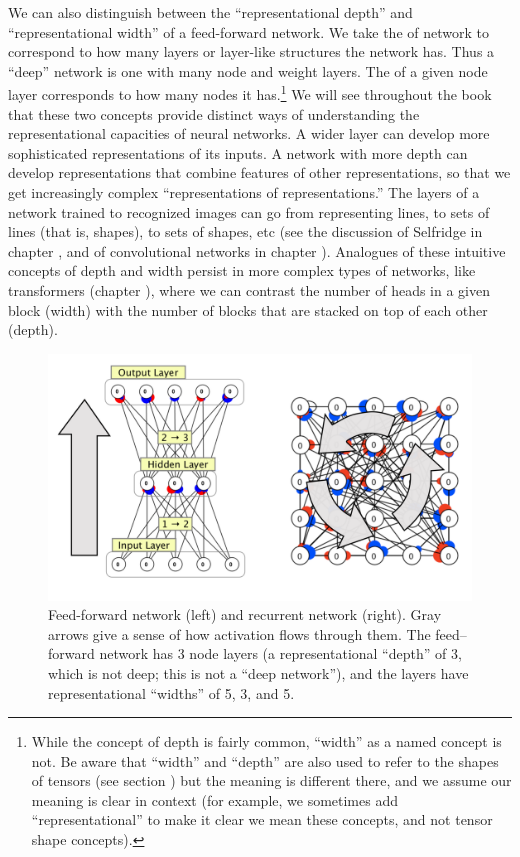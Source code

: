 We can also distinguish between the ``representational depth'' and ``representational width'' of a feed-forward network.  We take the  of network to correspond to how many layers or layer-like structures the network has. Thus a ``deep'' network is one with many node and weight layers. The  of a given node layer corresponds to how many nodes it has.\footnote{While the concept of depth is fairly common, ``width'' as a named concept is not. Be aware that ``width'' and ``depth'' are also used to refer to the shapes of tensors (see section ) but the meaning is different there, and we assume our meaning is clear in context (for example, we sometimes add ``representational'' to make it clear we mean these concepts, and not tensor shape concepts).} We will see throughout the book that these two concepts provide distinct ways of understanding the representational capacities of neural networks. A wider layer can develop more sophisticated representations of its inputs. A network with more depth can develop representations that combine features of other representations, so that we get increasingly complex ``representations of representations.'' The layers of a network trained to recognized images can go from representing lines, to sets of lines (that is, shapes), to sets of shapes, etc (see the discussion of Selfridge in chapter , and of convolutional networks in chapter ). Analogues of these intuitive concepts of depth and width persist in more complex types of networks, like transformers (chapter ), where we can contrast the number of heads in a given block (width) with the number of blocks that are stacked on top of each other (depth). 
 
\begin{figure}[h]
\centering
\includegraphics[scale=.7]{./images/NeuralNetTypes.png}
\caption[Simbrain screenshots with additional elements added by Pamela Payne.]{Feed-forward network (left) and recurrent network (right). Gray arrows give a sense of how activation flows through them. The feed--forward network has 3 node layers (a representational ``depth'' of 3, which is not deep; this is not a ``deep network''), and the layers have representational ``widths'' of 5, 3, and 5. }
\label{nn_types}
\end{figure}

